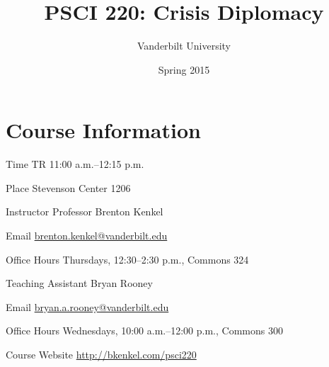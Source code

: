 \documentclass[nohyper]{tufte-handout}
\title{PSCI 220: Crisis Diplomacy}
\author{Vanderbilt University}
\date{Spring 2015}
\begin{document}
\maketitle

\section{Course Information}

\begin{compactdesc}
  \item[Time] TR 11:00 a.m.--12:15 p.m.
  \item[Place] Stevenson Center 1206
  \item[Instructor] Professor Brenton Kenkel
  \begin{compactdesc}
    \item[Email] \href{mailto:brenton.kenkel@vanderbilt.edu}{brenton.kenkel@vanderbilt.edu}
    \item[Office Hours] Thursdays, 12:30--2:30 p.m., Commons 324
  \end{compactdesc}
  \item[Teaching Assistant] Bryan Rooney
  \begin{compactdesc}
    \item[Email] \href{mailto:bryan.a.rooney@vanderbilt.edu}{bryan.a.rooney@vanderbilt.edu}
    \item[Office Hours] Wednesdays, 10:00 a.m.--12:00 p.m., Commons 300
  \end{compactdesc}
  \item[Course Website] \url{http://bkenkel.com/psci220}
\end{compactdesc}


\end{document}
